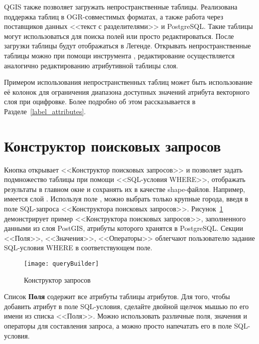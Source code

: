 
QGIS также позволяет загружать непространственные таблицы. Реализована
поддержка таблиц в OGR-совместимых форматах, а также работа через поставщиков
данных <<текст с разделителями>> и PostgreSQL. Такие таблицы могут использоваться
для поиска полей или просто редактироваться. После загрузки таблицы будут
отображаться в Легенде. Открывать непространственные таблицы можно при помощи
инструмента ,
редактирование осуществляется аналогично редактированию атрибутивной таблицы
слоя.

Примером использования непространственных таблиц может быть использование
её колонок для ограничения диапазона доступных значений атрибута векторного
слоя при оцифровке. Более подробно об этом рассказывается в Разделе~\ref{label_attributes}.

\section{Конструктор поисковых запросов}\label{sec:query_builder}

Кнопка  открывает <<Конструктор поисковых
запросов>> и позволяет задать подмножество таблицы при помощи
<<SQL-условия WHERE>>, отображать результаты в главном окне и сохранять
их в качестве shape-файлов. Например, имеется слой .
Используя поле , можно выбрать только крупные города,
введя  в поле SQL-запроса <<Конструктора
поисковых запросов>>. Рисунок~\ref{fig:query_builder} демонстрирует пример
<<Конструктора поисковых запросов>>, заполненного данными из слоя PostGIS,
атрибуты которого хранятся в PostgreSQL. Секции <<Поля>>, <<Значения>>,
<<Операторы>> облегчают пользователю задание SQL-условия WHERE в
соответствующем поле.

\begin{figure}[ht]
  \centering
    \texttt{[image: queryBuilder]}
    \caption{Конструктор запросов \wincaption}\label{fig:query_builder}
\end{figure}

Список \textbf{Поля} содержит все атрибуты таблицы атрибутов. Для того,
чтобы добавить атрибут в поле SQL-условия, сделайте двойной щелчок мышью
по его имени из списка <<Поля>>. Можно использовать различные поля, значения
и операторы для составления запроса, а можно просто напечатать его в поле
SQL-условия.


